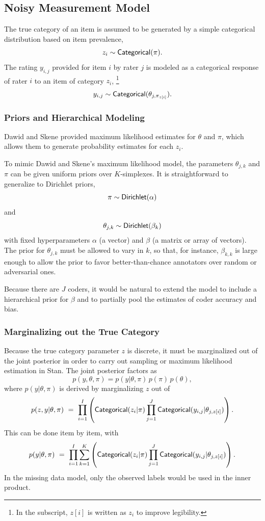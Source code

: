 \subsection{Noisy Measurement Model}

The true category of an item is assumed to be generated by a simple
categorical distribution based on item prevalence,
\[
z_i \sim \mbox{\sf Categorical}(\pi).
\]
%
The rating $y_{i, j}$ provided for item $i$ by rater $j$ is modeled as
a categorical response of rater $i$ to an item of category $z_i$,%
%
\footnote{In the subscript, $z[i]$ is written as $z_i$ to
  improve legibility.}
%
\[
y_{i, j} \sim \mbox{\sf Categorical}(\theta_{j,\pi_{z[i]}}).
\]

\subsubsection{Priors and Hierarchical Modeling}

Dawid and Skene provided maximum likelihood estimates for $\theta$ and
$\pi$, which allows them to generate probability estimates for each $z_i$.

To mimic Dawid and Skene's maximum likelihood model, the parameters
$\theta_{j,k}$ and $\pi$ can be given uniform priors over
$K$-simplexes.  It is straightforward to generalize to Dirichlet
priors,
\[
\pi \sim \mbox{\sf Dirichlet}(\alpha)
\]
and
\[
\theta_{j,k} \sim \mbox{\sf Dirichlet}(\beta_k)
\]
with fixed hyperparameters $\alpha$ (a vector) and $\beta$ (a matrix
or array of vectors).  The prior for $\theta_{j,k}$ must be allowed to
vary in $k$, so that, for instance, $\beta_{k,k}$ is large enough to
allow the prior to favor better-than-chance annotators over random or
adversarial ones.

Because there are $J$ coders, it would be natural to extend the model
to include a hierarchical prior for $\beta$ and to partially pool the
estimates of coder accuracy and bias.

\subsubsection{Marginalizing out the True Category}

Because the true category parameter $z$ is discrete, it must be
marginalized out of the joint posterior in order to carry out sampling
or maximum likelihood estimation in Stan. The joint posterior factors
as
\[
p(y, \theta, \pi) = p(y | \theta,\pi) \, p(\pi) \, p(\theta),
\]
where $p(y | \theta,\pi)$ is derived by marginalizing $z$ out of
%
\[
p(z, y | \theta, \pi)
\ = \
\prod_{i=1}^I \left( \mbox{\sf Categorical}(z_i | \pi)
                     \prod_{j=1}^J
                     \mbox{\sf Categorical}(y_{i, j}|\theta_{j, z[i]})
              \right).
\]
%
This can be done item by item, with
\[
p(y | \theta, \pi)
\ = \
\prod_{i=1}^I \sum_{k=1}^K
  \left( \mbox{\sf Categorical}(z_i | \pi)
         \prod_{j=1}^J
         \mbox{\sf Categorical}(y_{i, j}|\theta_{j, z[i]})
  \right).
\]
%
In the missing data model, only the observed labels would be used in
the inner product.

